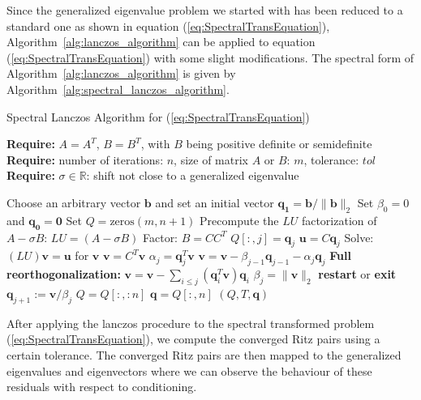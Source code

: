 Since the generalized eigenvalue problem we started with has been reduced to a standard one as shown in equation (\ref{eq:SpectralTransEquation}), Algorithm~\ref{alg:lanczos_algorithm} can be applied to equation (\ref{eq:SpectralTransEquation}) with some slight modifications. The spectral form of Algorithm~\ref{alg:lanczos_algorithm} is given by Algorithm~\ref{alg:spectral_lanczos_algorithm}.
\begin{algorithm}
	\caption{Spectral Lanczos Algorithm for (\ref{eq:SpectralTransEquation}) }
	\label{alg:spectral_lanczos_algorithm}
	
	\textbf{Require:} \( A = A^T \), \( B = B^T \), with \(B\) being positive definite or semidefinite\\
	\textbf{Require:} number of iterations: \(n\), size of matrix $A$ or $B$: $m$, tolerance: \(tol\)\\
	\textbf{Require:} \(\sigma \in \mathbb{R}\): shift not close to a generalized eigenvalue
	\begin{algorithmic}[1]
		\State Choose an arbitrary vector $\mathbf{b}$ and set an initial vector $\mathbf{q_1} = \mathbf{b}/ \|\mathbf{b}\|_2$
		\State Set $\beta_0 = 0$ and $\mathbf{q_0} = \mathbf{0}$
		\State Set $Q = \text{zeros}(m, n+1)$
		\State Precompute the $LU$ factorization of $A - \sigma B$: $LU = (A - \sigma B)$
		\State Factor: $B = CC^T$
		\State $Q[:, j] = \mathbf{q}_j$
		\State $\mathbf{u} = C\mathbf{q}_j$
		\State Solve: $(LU)\mathbf{v} = \mathbf{u}$ for $\mathbf{v}$
		\State $\mathbf{v} = C^T \mathbf{v}$
		\State $\alpha_j = \mathbf{q}_j^T \mathbf{v} $
		\State $\mathbf{v} = \mathbf{v} - \beta_{j-1}\mathbf{q}_{j-1} - \alpha_j \mathbf{q}_j$
		\State \textbf{Full reorthogonalization:} $\mathbf{v} = \mathbf{v} - \sum_{i \leq j} (\mathbf{q}_i^T \mathbf{v}) \mathbf{q}_i$
		\State $\beta_{j} = \|\mathbf{v}\|_2$
		\State \textbf{restart} or \textbf{exit}
		\EndIf
		\State $\mathbf{q}_{j+1} := \mathbf{v} / \beta_{j}$
		\EndIf
		\EndFor
		\State $Q = Q[:, :n]$
		\State $\mathbf{q} = Q[:, n]$
		\State \Return $(Q, T, \mathbf{q})$
		\EndFunction
	\end{algorithmic}
\end{algorithm}
After applying the lanczos procedure to the spectral transformed problem (\ref{eq:SpectralTransEquation}), we compute the converged Ritz pairs using a certain tolerance. The converged Ritz pairs are then mapped to the generalized eigenvalues and eigenvectors where we can observe the behaviour of these residuals with respect to conditioning.

